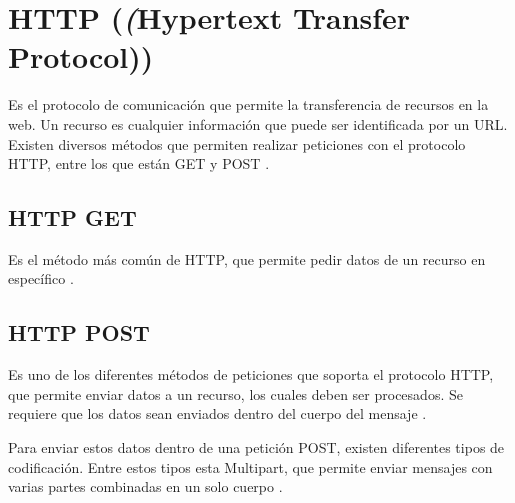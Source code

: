 \section{HTTP (\textit(Hypertext Transfer Protocol))}\label{HTTP}

Es el protocolo de comunicación que permite la transferencia de recursos en la web. Un recurso es cualquier información que puede ser identificada por un URL. Existen diversos métodos que permiten realizar peticiones con el protocolo HTTP, entre los que están GET y POST \cite{HTTP2}.

\subsection{HTTP GET}

Es el método más común de HTTP, que permite pedir datos de un recurso en específico \cite{HTTP3}. 

\subsection{HTTP POST}

Es uno de los diferentes métodos de peticiones que soporta el protocolo HTTP, que permite enviar datos a un recurso, los cuales deben ser procesados. Se requiere que los datos sean enviados dentro del cuerpo del mensaje \cite{HTTP3}.

Para enviar estos datos dentro de una petición POST, existen diferentes tipos de codificación. Entre estos tipos esta Multipart, que permite enviar mensajes con varias partes combinadas en un solo cuerpo \cite{HTTP1}.
